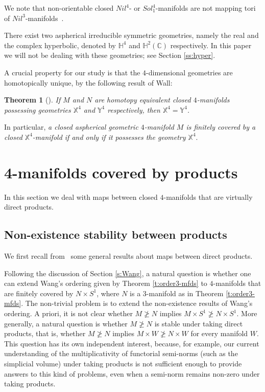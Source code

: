 \documentclass[12pt]{amsart}
\newtheorem{thm}{Theorem}[section]
\theoremstyle{remark}
\begin{document}
We note that non-orientable closed $Nil^4$- or $Sol_1^4$-manifolds are not mapping tori of $Nil^3$-manifolds~\cite[Theorem
8.9]{Hillman}. 

\medskip 

 There exist two aspherical irreducible symmetric geometries, namely the real and the complex hyperbolic, denoted
by $\mathbb{H}^4$ and $\mathbb{H}^2(\mathbb{C})$ respectively. In this paper we will not be dealing with these geometries; see Section \ref{ss:hyper}.

\medskip

A crucial property for our study is that the $4$-dimensional geometries are homotopically unique, by the following result of Wall:

\begin{thm}[]\label{t:Wall4Dgeometries}
 If $M$ and $N$ are homotopy equivalent closed $4$-manifolds possessing geometries $\mathbb{X}^4$ and $\mathbb{Y}^4$ respectively, then
$\mathbb{X}^4 = \mathbb{Y}^4$.
\end{thm}

In particular, {\em a closed aspherical geometric $4$-manifold $M$ is finitely covered by a closed $\mathbb{X}^4$-manifold if and only if it possesses the geometry $\mathbb{X}^4$}.

\section{4-manifolds covered by products}\label{s:products}

In this section we deal with maps between closed $4$-manifolds that are virtually direct products.

\subsection{Non-existence stability between products}

We first recall from~\cite{Neothesis,KotschickLoehNeofytidis} some general results about maps between direct products.

Following the discussion of Section \ref{s:Wang}, a natural question is whether one can extend Wang's ordering given by Theorem \ref{t:order3-mfds} to $4$-manifolds that are finitely covered by $N\times S^1$, where $N$ is a $3$-manifold as in Theorem \ref{t:order3-mfds}. The non-trivial problem is to extend the non-existence results of Wang's ordering. A priori, it is not clear whether $M\ngeq N$ implies $M\times S^1 \ngeq N\times S^1$. More generally, a natural question is whether $M\ngeq N$ is stable under taking direct products, that is, whether $M\ngeq N$ implies $M\times W \ngeq N\times W$ for every manifold $W$. This question has its own independent interest, because, for example, our current understanding of the multiplicativity of functorial semi-norms (such as the simplicial volume) under taking products is not sufficient enough to provide answers to this kind of problems, even when a semi-norm remains non-zero under taking products.
\end{document}

